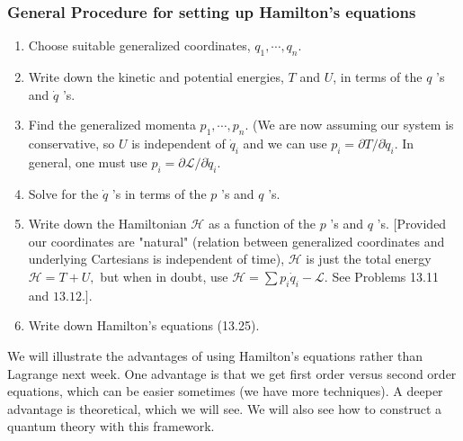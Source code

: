 \documentclass[../PHYS306Notes.tex]{subfiles}
\begin{document}
\subsubsection{General Procedure for setting up Hamilton's equations}
\begin{enumerate}[1.]
\item Choose suitable generalized coordinates, $q_{1}, \cdots, q_{n}$.
\item Write down the kinetic and potential energies, $T$ and $U$, in terms of the $q$ 's and $\dot{q}$ 's. 
\item Find the generalized momenta $p_{1}, \cdots, p_{n} .$ (We are now assuming our system is conservative, so $U$ is independent of $\dot{q}_{i}$ and we can use $p_{i}=\partial T / \partial \dot{q}_{i} .$ In general, one must use $p_{i}=\partial \mathcal{L} / \partial \dot{q}_{i}$. 
\item Solve for the $\dot{q}$ 's in terms of the $p$ 's and $q$ 's.
\item Write down the Hamiltonian $\mathcal{H}$ as a function of the $p$ 's and $q$ 's. [Provided our coordinates are "natural" (relation between generalized coordinates and underlying Cartesians is independent of time), $\mathcal{H}$ is just the total energy $\mathcal{H}=T+U,$ but when in doubt, use $\mathcal{H}=\sum p_{i} \dot{q}_{i}-\mathcal{L} .$ See Problems 13.11
and $13.12 .]$.
\item Write down Hamilton's equations (13.25).
\end{enumerate}
We will illustrate the advantages of using Hamilton's equations rather than Lagrange next week. One advantage is that we get first order versus second order equations, which can be easier sometimes (we have more techniques). A deeper advantage is theoretical, which we will see. We will also see how to construct a quantum theory with this framework.
\end{document}
